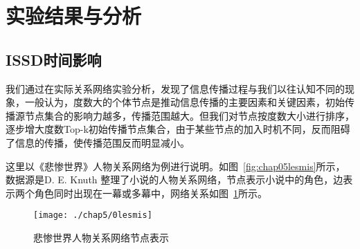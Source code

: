 \section{实验结果与分析}
\subsection{ISSD时间影响}
我们通过在实际关系网络实验分析，发现了信息传播过程与我们以往认知不同的现象，一般认为，度数大的个体节点是推动信息传播的主要因素和关键因素，初始传播源节点集合的影响力越多，传播范围越大。但我们对节点按度数大小进行排序，逐步增大度数Top-k初始传播节点集合，由于某些节点的加入时机不同，反而阻碍了信息的传播，使传播范围反而明显减小。

这里以《悲惨世界》人物关系网络\cite{knuth1993stanford}为例进行说明。如图~\ref{fig:chap05lesmis}所示，数据源\cite{knuth1993stanford}是D. E. Knuth 整理了小说的人物关系网络，节点表示小说中的角色，边表示两个角色同时出现在一幕或多幕中，网络关系如图~\ref{fig:chap050lesmis}所示。
\begin{figure}[H] 
	\centering
	\texttt{[image: ./chap5/0lesmis]}
	\caption{悲惨世界人物关系网络节点表示}
	\label{fig:chap050lesmis}
\end{figure}

